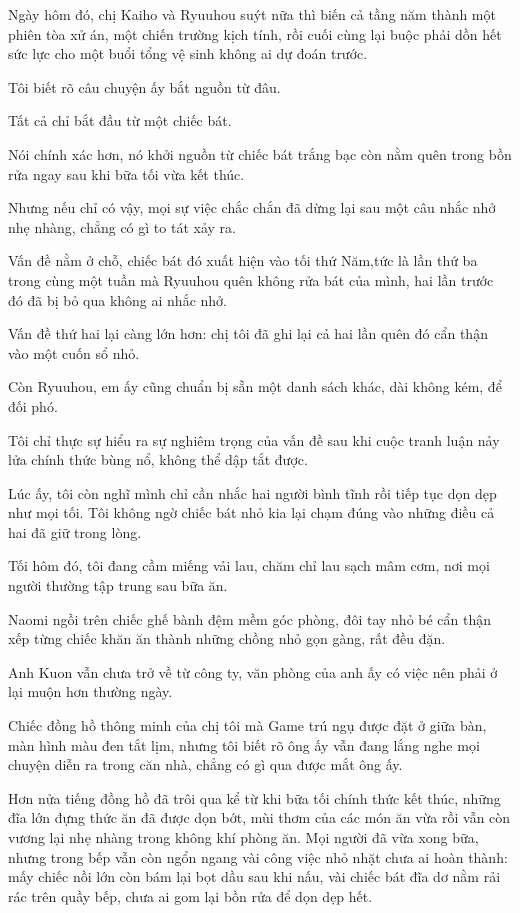 \documentclass[../main.tex]{subfiles}
\begin{document}


Ngày hôm đó, chị Kaiho và Ryuuhou suýt nữa thì biến cả tầng năm thành một phiên tòa xử án, một chiến trường kịch tính, rồi cuối cùng lại buộc phải dồn hết sức lực cho một buổi tổng vệ sinh không ai dự đoán trước.

Tôi biết rõ câu chuyện ấy bắt nguồn từ đâu.

Tất cả chỉ bắt đầu từ một chiếc bát.

Nói chính xác hơn, nó khởi nguồn từ chiếc bát trắng bạc còn nằm quên trong bồn rửa ngay sau khi bữa tối vừa kết thúc.

Nhưng nếu chỉ có vậy, mọi sự việc chắc chắn đã dừng lại sau một câu nhắc nhở nhẹ nhàng, chẳng có gì to tát xảy ra.

Vấn đề nằm ở chỗ, chiếc bát đó xuất hiện vào tối thứ Năm,tức là lần thứ ba trong cùng một tuần mà Ryuuhou quên không rửa bát của mình, hai lần trước đó đã bị bỏ qua không ai nhắc nhở.

Vấn đề thứ hai lại càng lớn hơn: chị tôi đã ghi lại cả hai lần quên đó cẩn thận vào một cuốn sổ nhỏ.

Còn Ryuuhou, em ấy cũng chuẩn bị sẵn một danh sách khác, dài không kém, để đối phó.

Tôi chỉ thực sự hiểu ra sự nghiêm trọng của vấn đề sau khi cuộc tranh luận nảy lửa chính thức bùng nổ, không thể dập tắt được.

Lúc ấy, tôi còn nghĩ mình chỉ cần nhắc hai người bình tĩnh rồi tiếp tục dọn dẹp như mọi tối. Tôi không ngờ chiếc bát nhỏ kia lại chạm đúng vào những điều cả hai đã giữ trong lòng.

\il

Tối hôm đó, tôi đang cầm miếng vải lau, chăm chỉ lau sạch mâm cơm, nơi mọi người thường tập trung sau bữa ăn.

Naomi ngồi trên chiếc ghế bành đệm mềm góc phòng, đôi tay nhỏ bé cẩn thận xếp từng chiếc khăn ăn thành những chồng nhỏ gọn gàng, rất đều đặn.

Anh Kuon vẫn chưa trở về từ công ty, văn phòng của anh ấy có việc nên phải ở lại muộn hơn thường ngày.

Chiếc đồng hồ thông minh của chị tôi mà Game trú ngụ được đặt ở giữa bàn, màn hình màu đen tắt lịm, nhưng tôi biết rõ ông ấy vẫn đang lắng nghe mọi chuyện diễn ra trong căn nhà, chẳng có gì qua được mắt ông ấy.

Hơn nửa tiếng đồng hồ đã trôi qua kể từ khi bữa tối chính thức kết thúc, những đĩa lớn đựng thức ăn đã được dọn bớt, mùi thơm của các món ăn vừa rồi vẫn còn vương lại nhẹ nhàng trong không khí phòng ăn. Mọi người đã vừa xong bữa, nhưng trong bếp vẫn còn ngổn ngang vài công việc nhỏ nhặt chưa ai hoàn thành: mấy chiếc nồi lớn còn bám lại bọt dầu sau khi nấu, vài chiếc bát đĩa dơ nằm rải rác trên quầy bếp, chưa ai gom lại bồn rửa để dọn dẹp hết.
\end{document}
